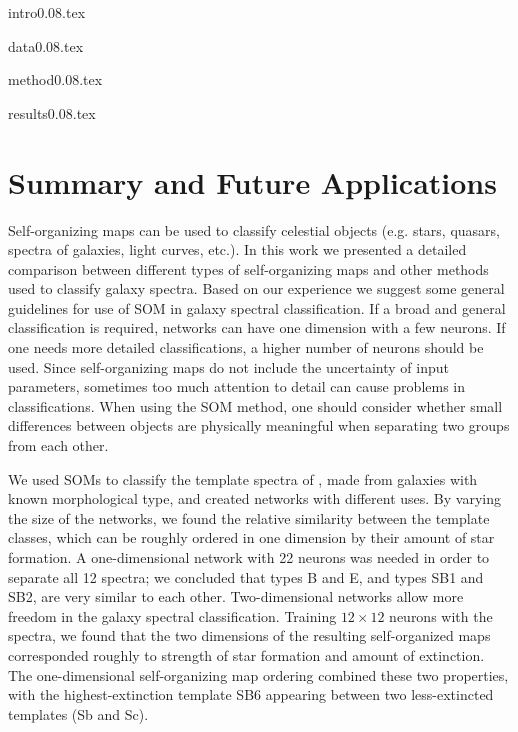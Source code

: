 \documentclass[useAMS,usenatbib]{mn2e}
\begin{document}
{intro0.08.tex}

{data0.08.tex}

{method0.08.tex}

{results0.08.tex}

\section{Summary and Future Applications}
\label{sec: summary_SOMZ}

    Self-organizing maps can be used to classify celestial objects (e.g. stars, quasars, spectra of galaxies, light curves, etc.).
    In this work we presented a detailed comparison between different types of self-organizing maps and other methods used to classify galaxy spectra.
    Based on our experience we suggest some general guidelines for use of SOM in galaxy spectral classification.
    If a broad and general classification is required, networks can have one dimension with a few neurons. 
    If one needs more detailed classifications, a higher number of neurons should be used.
    Since self-organizing maps do not include the uncertainty of input parameters, sometimes too much attention to detail can cause problems in classifications. 
    When using the SOM method, one should consider whether small differences between objects are physically meaningful when separating two groups from each other.

    We used SOMs to classify the template spectra of , made from galaxies with known morphological type, and created networks with different uses.
    By varying the size of the networks, we found the relative similarity between the  template classes, which can be roughly ordered in one dimension by their amount of star formation.
     A one-dimensional network with 22 neurons was needed in order to
    separate all 12  spectra; we concluded that  types B and E, and types SB1 and SB2, are very similar to each other.
    Two-dimensional networks allow more freedom in the galaxy spectral classification.
    Training $12\times 12$ neurons with the  spectra, we found that the two dimensions of the resulting self-organized maps corresponded roughly to strength of star formation and amount of extinction. The one-dimensional self-organizing map ordering combined these two properties, with the highest-extinction template SB6 appearing between two less-extincted templates (Sb and Sc).
    
\end{document}
